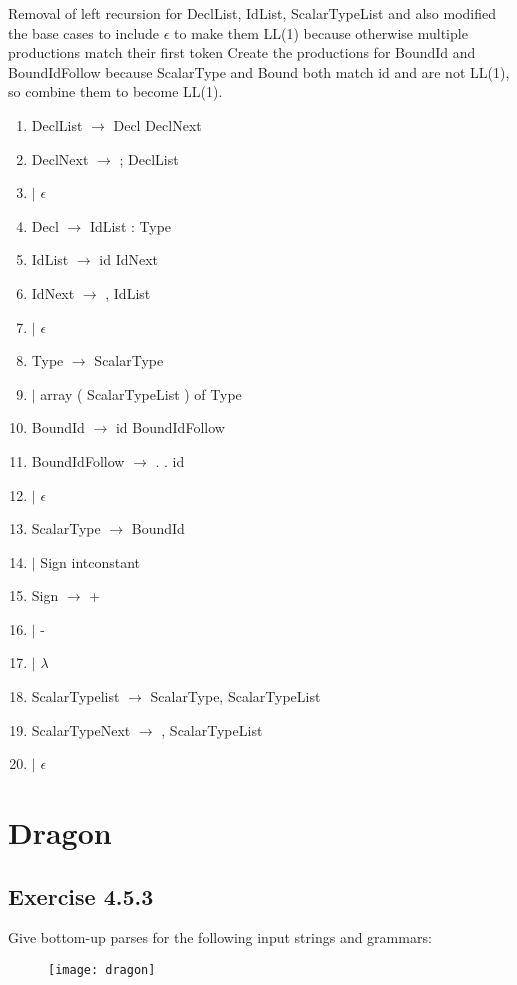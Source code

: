\documentclass[letterpaper, 10pt, DIV=13]{scrartcl}
\numberwithin{equation}{section}
\numberwithin{figure}{section}
\numberwithin{table}{section}
\begin{document}
Removal of left recursion for DeclList, IdList, ScalarTypeList and also
modified the base cases to include $\epsilon$ to make them LL(1) because
otherwise multiple productions match their first token Create the productions
for BoundId and BoundIdFollow because ScalarType and Bound both match id and
are not LL(1), so combine them to become LL(1).
\begin{enumerate}
    \item DeclList $\rightarrow$ Decl DeclNext
    \item DeclNext $\rightarrow$ ; DeclList
    \item $\mid$ $\epsilon$
    \item Decl $\rightarrow$ IdList : Type
    \item IdList $\rightarrow$ id IdNext
    \item IdNext $\rightarrow$ , IdList
    \item $\mid$ $\epsilon$
    \item Type $\rightarrow$ ScalarType
    \item $\mid$ array ( ScalarTypeList ) of Type
    \item BoundId $\rightarrow$ id BoundIdFollow
    \item BoundIdFollow $\rightarrow$ . . id
    \item $\mid$ $\epsilon$
    \item ScalarType $\rightarrow$ BoundId
    \item $\mid$ Sign intconstant
    \item Sign $\rightarrow$ +
    \item $\mid$ - 
    \item $\mid$ $\lambda$ 
    \item ScalarTypelist $\rightarrow$ ScalarType, ScalarTypeList
    \item ScalarTypeNext $\rightarrow$ , ScalarTypeList
    \item $\mid$ $\epsilon$
\end{enumerate}

\section{Dragon}
\subsection{Exercise 4.5.3}
Give bottom-up parses for the following input strings and
grammars:
\begin{figure}[ht] 
    \centering 
    \texttt{[image: dragon]}
\end{figure}
\end{document}
